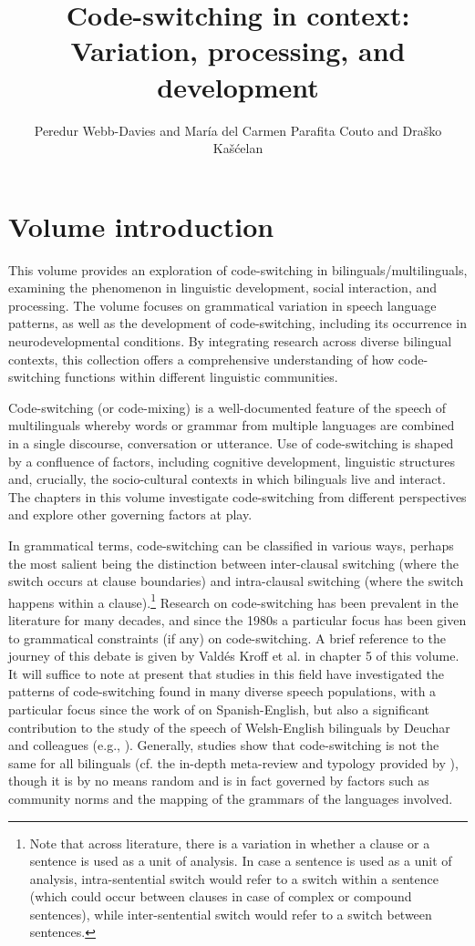 \documentclass[output=paper]{langscibook}
\author{Peredur Webb-Davies\orcid{}\affiliation{Bangor University} and María del Carmen Parafita Couto\orcid{}\affiliation{University of Santiago de Compostela} and Draško Kašćelan\orcid{}\affiliation{University of Essex}}
\title{Code-switching in context: Variation, processing, and development}
\begin{document}
\maketitle 

\section{Volume introduction}

This volume provides an exploration of code-switching in bilinguals{\slash}multilin\-guals, examining the phenomenon in linguistic development, social interaction, and processing. The volume focuses on grammatical variation in speech language patterns, as well as the development of code-switching, including its occurrence in neurodevelopmental conditions. By integrating research across diverse bilingual contexts, this collection offers a comprehensive understanding of how code-switching functions within different linguistic communities.

Code-switching (or code-mixing) is a well-documented feature of the speech of multilinguals whereby words or grammar from multiple languages are combined in a single discourse, conversation or utterance. Use of code-switching is shaped by a confluence of factors, including cognitive development, linguistic structures and, crucially, the socio-cultural contexts in which bilinguals live and interact. The chapters in this volume investigate code-switching from different perspectives and explore other governing factors at play.

In grammatical terms, code-switching can be classified in various ways, perhaps the most salient being the distinction between inter-clausal switching (where the switch occurs at clause boundaries) and intra-clausal switching (where the switch happens within a clause).\footnote{Note that across literature, there is a variation in whether a clause or a sentence is used as a unit of analysis. In case a sentence is used as a unit of analysis, intra-sentential switch would refer to a switch within a sentence (which could occur between clauses in case of complex or compound sentences), while inter-sentential switch would refer to a switch between sentences.} Research on code-switching has been prevalent in the literature for many decades, and since the 1980s a particular focus has been given to grammatical constraints (if any) on code-switching. A brief reference to the journey of this debate is given by Valdés Kroff et al. in chapter 5 of this volume. It will suffice to note at present that studies in this field have investigated the patterns of code-switching found in many diverse speech populations, with a particular focus since the work of \citet{Poplack1980} on Spanish-English, but also a significant contribution to the study of the speech of Welsh-English bilinguals by Deuchar and colleagues (e.g., \citealt{DeucharEtAl2014, DeucharEtAl2018}). Generally, studies show that code-switching is not the same for all bilinguals (cf. the in-depth meta-review and typology provided by \citealt{Muysken2001}), though it is by no means random and is in fact governed by factors such as community norms and the mapping of the grammars of the languages involved.
\end{document}
